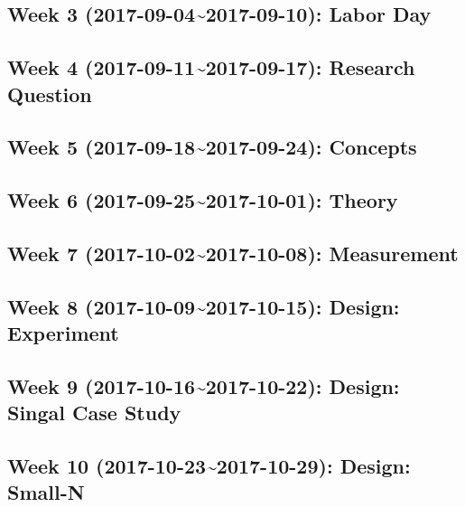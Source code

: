 \documentclass[11pt,]{article}
\begin{document}
\subsection{Week 3 (2017-09-04\textasciitilde{}2017-09-10): Labor
Day}\label{week-3-2017-09-042017-09-10-labor-day}

\subsection{Week 4 (2017-09-11\textasciitilde{}2017-09-17): Research
Question}\label{week-4-2017-09-112017-09-17-research-question}

\subsection{Week 5 (2017-09-18\textasciitilde{}2017-09-24):
Concepts}\label{week-5-2017-09-182017-09-24-concepts}

\subsection{Week 6 (2017-09-25\textasciitilde{}2017-10-01):
Theory}\label{week-6-2017-09-252017-10-01-theory}

\subsection{Week 7 (2017-10-02\textasciitilde{}2017-10-08):
Measurement}\label{week-7-2017-10-022017-10-08-measurement}

\subsection{Week 8 (2017-10-09\textasciitilde{}2017-10-15): Design:
Experiment}\label{week-8-2017-10-092017-10-15-design-experiment}

\subsection{Week 9 (2017-10-16\textasciitilde{}2017-10-22): Design:
Singal Case
Study}\label{week-9-2017-10-162017-10-22-design-singal-case-study}

\subsection{Week 10 (2017-10-23\textasciitilde{}2017-10-29): Design:
Small-N}\label{week-10-2017-10-232017-10-29-design-small-n}
\end{document}
